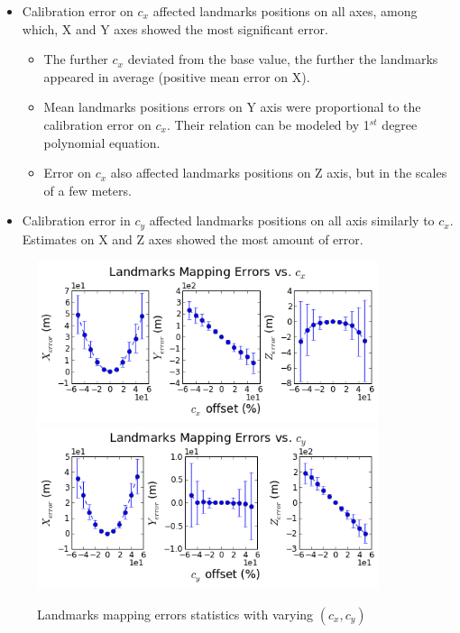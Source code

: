 \begin{itemize}
  \item Calibration error on $c_{x}$ affected landmarks positions on all
  axes, among which, X and Y axes showed the most significant error.
  \begin{itemize}
    \item The further $c_{x}$ deviated from the base value, the further
    the landmarks appeared in average (positive mean error on X).
    \item Mean landmarks positions errors on Y axis were proportional to
    the calibration error on $c_x$. Their relation can be modeled by
    1$^{st}$ degree polynomial equation.
    \item Error on $c_{x}$ also affected landmarks positions on Z
    axis, but in the scales of a few meters.
  \end{itemize}
  \item Calibration error in $c_{y}$ affected landmarks positions on
  all axis similarly to $c_{x}$. Estimates on X and Z axes showed the
  most amount of error.
\end{itemize}

\begin{figure}[h] %
  \centering
  \includegraphics[width=10cm, keepaspectratio=true]{./Figures/SimulationFigures/Figure28.png}
  \includegraphics[width=10cm, keepaspectratio=true]{./Figures/SimulationFigures/Figure29.png}
  \caption{Landmarks mapping errors statistics with varying $(c_x, c_y)$}
  \label{fig:simfig28-29}
\end{figure}

